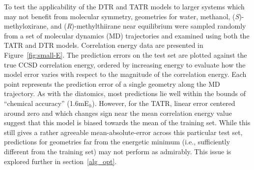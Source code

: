 To test the applicability of the DTR and TATR models to larger systems which may not benefit from molecular symmetry, geometries for water, methanol, (\textit{S})-methyloxirane, and (\textit{R})-methylthiirane near equilibrium were sampled randomly from a set of molecular dynamics (MD) trajectories and examined using both the TATR and DTR models.
Correlation energy data are presented in Figure~\ref{fig:small-E}. The prediction errors on the test set are plotted against the true CCSD correlation energy, ordered by increasing energy to evaluate how the model error varies with respect to the magnitude of the correlation energy.
Each point represents the prediction error of a single geometry along the MD trajectory.
As with the diatomics, most predictions lie well within the bounds of ``chemical accuracy'' (1.6mE$_h$). However, for the TATR, linear error centered around zero and which changes sign near the mean correlation energy value suggest that this model is biased towards the mean of the training set. 
While this still gives a rather agreeable mean-absolute-error across this particular test set, predictions for geometries far from the energetic minimum (i.e., sufficiently different from the training set) may not perform as admirably. This issue is explored further in section~\ref{alg_opt}.


